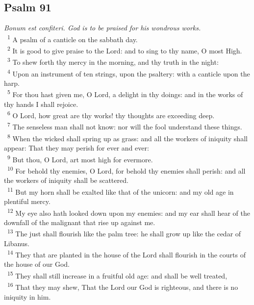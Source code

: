 \documentclass[a5paper,12pt]{article}
\begin{document}
\begin{multicols*}{2}
\section{Psalm 91}
\label{sec:orge276872}
\emph{Bonum est confiteri. God is to be praised for his wondrous works.}\\

~\textsuperscript{1} A psalm of a canticle on the sabbath day.\\
~\textsuperscript{2} It is good to give praise to the Lord: and to sing to thy name, O most High.\\
~\textsuperscript{3} To shew forth thy mercy in the morning, and thy truth in the night:\\
~\textsuperscript{4} Upon an instrument of ten strings, upon the psaltery: with a canticle upon the harp.\\
~\textsuperscript{5} For thou hast given me, O Lord, a delight in thy doings: and in the works of thy hands I shall rejoice.\\
~\textsuperscript{6} O Lord, how great are thy works! thy thoughts are exceeding deep.\\
~\textsuperscript{7} The senseless man shall not know: nor will the fool understand these things.\\
~\textsuperscript{8} When the wicked shall spring up as grass: and all the workers of iniquity shall appear: That they may perish for ever and ever:\\
~\textsuperscript{9} But thou, O Lord, art most high for evermore.\\
~\textsuperscript{10} For behold thy enemies, O Lord, for behold thy enemies shall perish: and all the workers of iniquity shall be scattered.\\
~\textsuperscript{11} But my horn shall be exalted like that of the unicorn: and my old age in plentiful mercy.\\
~\textsuperscript{12} My eye also hath looked down upon my enemies: and my ear shall hear of the downfall of the malignant that rise up against me.\\
~\textsuperscript{13} The just shall flourish like the palm tree: he shall grow up like the cedar of Libanus.\\
~\textsuperscript{14} They that are planted in the house of the Lord shall flourish in the courts of the house of our God.\\
~\textsuperscript{15} They shall still increase in a fruitful old age: and shall be well treated,\\
~\textsuperscript{16} That they may shew, That the Lord our God is righteous, and there is no iniquity in him.\\


\end{multicols*}
\end{document}
